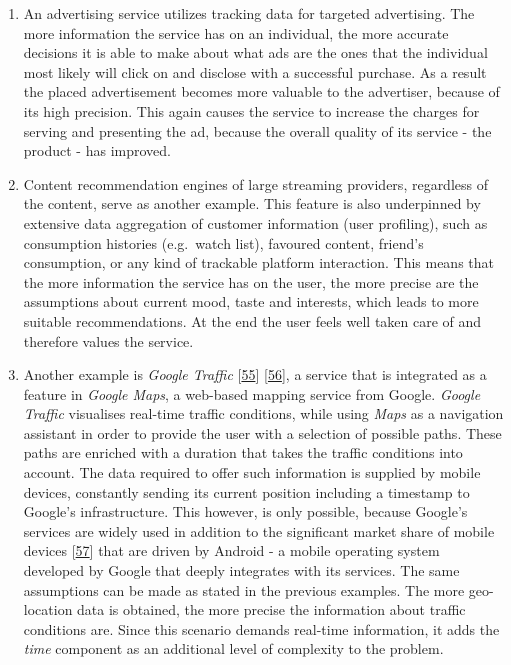 \documentclass[12pt,english,a4paper,titlepage,cleardoublepage=empty,dottedtoc]{report}
\begin{document}
\begin{enumerate}
\def\labelenumi{(\Alph{enumi})}
\item
  An advertising service utilizes tracking data for targeted
  advertising. The more information the service has on an individual,
  the more accurate decisions it is able to make about what ads are the
  ones that the individual most likely will click on and disclose with a
  successful purchase. As a result the placed advertisement becomes more
  valuable to the advertiser, because of its high precision. This again
  causes the service to increase the charges for serving and presenting
  the ad, because the overall quality of its service - the product - has
  improved.
\item
  Content recommendation engines of large streaming providers,
  regardless of the content, serve as another example. This feature is
  also underpinned by extensive data aggregation of customer information
  (user profiling), such as consumption histories (e.g.~watch list),
  favoured content, friend's consumption, or any kind of trackable
  platform interaction. This means that the more information the service
  has on the user, the more precise are the assumptions about current
  mood, taste and interests, which leads to more suitable
  recommendations. At the end the user feels well taken care of and
  therefore values the service.
\item
  Another example is \emph{Google Traffic}
  {[}\protect\hyperlink{ref-web_2007_introducing-google-traffic}{55}{]}
  {[}\protect\hyperlink{ref-web_2016_wikipedia_google-traffic}{56}{]}, a
  service that is integrated as a feature in \emph{Google Maps}, a
  web-based mapping service from Google. \emph{Google Traffic}
  visualises real-time traffic conditions, while using \emph{Maps} as a
  navigation assistant in order to provide the user with a selection of
  possible paths. These paths are enriched with a duration that takes
  the traffic conditions into account. The data required to offer such
  information is supplied by mobile devices, constantly sending its
  current position including a timestamp to Google's infrastructure.
  This however, is only possible, because Google's services are widely
  used in addition to the significant market share of mobile devices
  {[}\protect\hyperlink{ref-graphic_2016_global-mobile-os-market-share}{57}{]}
  that are driven by Android - a mobile operating system developed by
  Google that deeply integrates with its services. The same assumptions
  can be made as stated in the previous examples. The more geo-location
  data is obtained, the more precise the information about traffic
  conditions are. Since this scenario demands real-time information, it
  adds the \emph{time} component as an additional level of complexity to
  the problem.
\end{enumerate}
\end{document}
